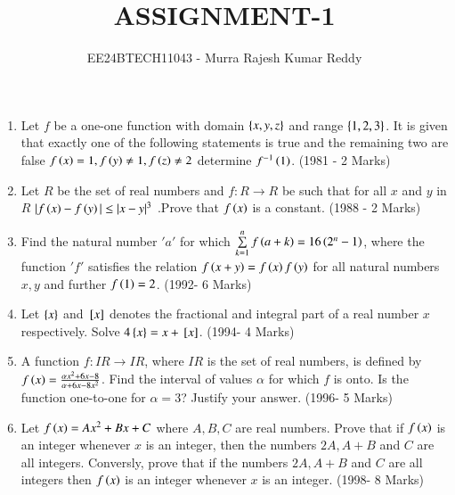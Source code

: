 \documentclass[journal,12pt,onecolumn,article]{IEEEtran}
\theoremstyle{remark}
\begin{document}

\vspace{3cm}
\title{ASSIGNMENT-1}
\author{EE24BTECH11043 - Murra Rajesh Kumar Reddy}
\maketitle
\bigskip
\begin{enumerate}
	\item Let $f$ be a one-one function with domain $\left\{x,y,z\right\}$ and range $\left\{1,2,3\right\}$. It is given that exactly one of the following statements is true and the remaining two are false ${f\left(x\right)=1},{f\left(y\right)\neq1},{f\left(z\right)\neq2}$ determine $f^{-1}\left(1\right)$. \hfill(1981 - 2 Marks)
	\item Let $R$ be the set of real numbers and $f:R \to R$ be such that for all $x$ and $y$ in $R$ ${|f\left(x\right)-f\left(y\right)| \le |x-y|^3}$ .Prove that $f\left(x\right)$ is a constant. \hfill(1988 - 2 Marks)
	\item Find the natural number $'a'$ for which ${\sum\limits_{k=1}^nf\left(a+k\right)=16\left(2^n -1\right)}$, where the function $'f'$ satisfies the relation ${f\left(x+y\right)=f\left(x\right)f\left(y\right)}$ for all natural numbers $x, y$ and further ${f\left(1\right)=2}$. \hfill(1992- 6 Marks)
	\item Let $\left\{x\right\}$ and ${}\left[x\right]$ denotes the fractional and integral part of a real number $x$ respectively. Solve ${4\left\{x\right\}=x+{}\left[x\right]}$. \hfill(1994- 4 Marks)
	\item A function $f:IR\to IR$, where $IR$ is the set of real numbers, is defined by ${f\left(x\right)=\frac{\alpha x^2 +6x -8}{\alpha +6x-8x^2}}$. Find the interval of values $\alpha$ for which $f$ is onto. Is the function one-to-one for $\alpha=3$? Justify your answer. \hfill(1996- 5 Marks)
	\item Let ${f\left(x\right)=Ax^2+Bx+C}$ where $A,B,C$ are real numbers. Prove that if $f\left(x\right)$ is an integer whenever $x$ is an integer, then the numbers $2A, A+B$ and $C$ are all integers. Conversly, prove that if the numbers $2A, A+B$ and $C$ are all integers then $f\left(x\right)$ is an integer whenever $x$ is an integer. \hfill(1998- 8 Marks)
\end{enumerate}
\end{document}
